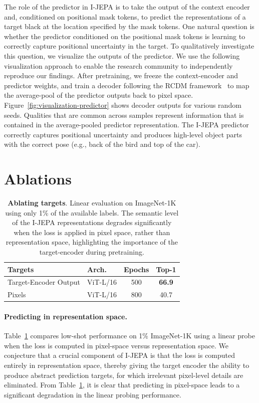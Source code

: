 \documentclass[10pt,twocolumn,letterpaper]{article}
\newcommand{\cc}{\cellcolor{fbApp}}
\newcommand{\putalg}{{I-JEPA}\xspace}
\begin{document}
The role of the predictor in \putalg is to take the output of the context encoder and, conditioned on positional mask tokens, to predict the representations of a target black at the location specified by the mask tokens.
One natural question is whether the predictor conditioned on the positional mask tokens is learning to correctly capture positional uncertainty in the target.
To qualitatively investigate this question, we visualize the outputs of the predictor.
We use the following visualization approach to enable the research community to independently reproduce our findings.
After pretraining, we freeze the context-encoder and predictor weights, and train a decoder following the RCDM framework~\cite{bordes2022high} to map the average-pool of the predictor outputs back to pixel space.
Figure~\ref{fig:visualization-predictor} shows decoder outputs for various random seeds.
Qualities that are common across samples represent information that is contained in the average-pooled predictor representation.
The \putalg predictor correctly captures positional uncertainty and produces high-level object parts with the correct pose (e.g., back of the bird and top of the car). 


\section{Ablations}
\label{sec:ablations}

\begin{table}[!h]
    \centering
    \begin{tabular}{l l c c}
        \bf\small Targets & \bf\small Arch. & \bf\small Epochs & \bf\small Top-1 \\
        \toprule
        \cc \small Target-Encoder Output & \cc\small ViT-L/16 & \cc 500 & \cc\bf 66.9 \\
        \small Pixels & \small ViT-L/16 & 800 & 40.7
    \end{tabular}
    \caption{\textbf{Ablating targets}.
    Linear evaluation on ImageNet-1K using only 1\% of the available labels.
    The semantic level of the \putalg representations degrades significantly when the loss is applied in pixel space, rather than representation space, highlighting the importance of the target-encoder during pretraining.}
    \label{tb:ablation-rep-space}
\end{table}
\paragraph{Predicting in representation space.}
Table~\ref{tb:ablation-rep-space} compares low-shot performance on 1\% ImageNet-1K using a linear probe when the loss is computed in pixel-space versus representation space.
We conjecture that a crucial component of \putalg is that the loss is computed entirely in representation space, thereby giving the target encoder the ability to produce abstract prediction targets, for which irrelevant pixel-level details are eliminated.
From Table~\ref{tb:ablation-rep-space}, it is clear that predicting in pixel-space leads to a significant degradation in the linear probing performance.
\end{document}
